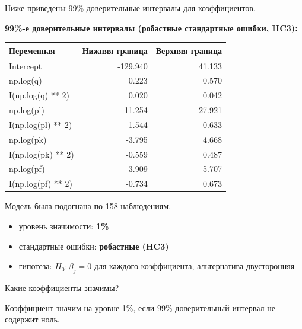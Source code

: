 \documentclass[
  russian,
]{article}
\newcounter{none} %
\providecommand{\tightlist}{%
  \setlength{\itemsep}{0pt}\setlength{\parskip}{0pt}}
\begin{document}
Ниже приведены 99\%-доверительные интервалы для коэффициентов.

\textbf{99\%-е доверительные интервалы (робастные стандартные ошибки,
HC3):}

{\def\LTcaptype{none} %
\begin{longtable}[]{@{}lrr@{}}
\toprule\noalign{}
Переменная & Нижняя граница & Верхняя граница \\
\midrule\noalign{}
\endhead
\bottomrule\noalign{}
\endlastfoot
Intercept & -129.940 & 41.133 \\
np.log(q) & 0.223 & 0.570 \\
I(np.log(q) ** 2) & 0.020 & 0.042 \\
np.log(pl) & -11.254 & 27.921 \\
I(np.log(pl) ** 2) & -1.544 & 0.633 \\
np.log(pk) & -3.795 & 4.668 \\
I(np.log(pk) ** 2) & -0.559 & 0.487 \\
np.log(pf) & -3.909 & 5.707 \\
I(np.log(pf) ** 2) & -0.734 & 0.673 \\
\end{longtable}
}

Модель была подогнана по 158 наблюдениям.

\begin{tcolorbox}[enhanced jigsaw, arc=.35mm, bottomrule=.15mm, bottomtitle=1mm, breakable, colback=white, colbacktitle=quarto-callout-important-color!10!white, colframe=quarto-callout-important-color-frame, coltitle=black, left=2mm, leftrule=.75mm, opacityback=0, opacitybacktitle=0.6, rightrule=.15mm, title=\textcolor{quarto-callout-important-color}{\faExclamation}\hspace{0.5em}{Условия теста}, titlerule=0mm, toprule=.15mm, toptitle=1mm]

\begin{itemize}
\tightlist
\item
  уровень значимости: \textbf{1\%}
\item
  стандартные ошибки: \textbf{робастные (HC3)}
\item
  гипотеза: \(H_0:\beta_j=0\) для каждого коэффициента, альтернатива
  двусторонняя
\end{itemize}

\end{tcolorbox}

Какие коэффициенты значимы?

Коэффициент значим на уровне 1\%, если 99\%-доверительный интервал не
содержит ноль.
\end{document}

